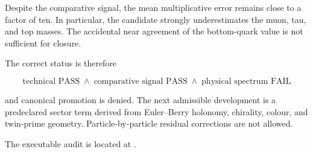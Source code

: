 Despite the comparative signal, the mean multiplicative error remains close
to a factor of ten.  In particular, the candidate strongly underestimates the
muon, tau, and top masses.  The accidental near agreement of the bottom-quark
value is not sufficient for closure.

The correct status is therefore

\begin{equation}
\boxed{
\text{technical PASS}
\;\wedge\;
\text{comparative signal PASS}
\;\wedge\;
\text{physical spectrum FAIL}
}
\end{equation}

and canonical promotion is denied.  The next admissible development is a
predeclared sector term derived from Euler--Berry holonomy, chirality, colour,
and twin-prime geometry.  Particle-by-particle residual corrections are not
allowed.

The executable audit is located at
.
